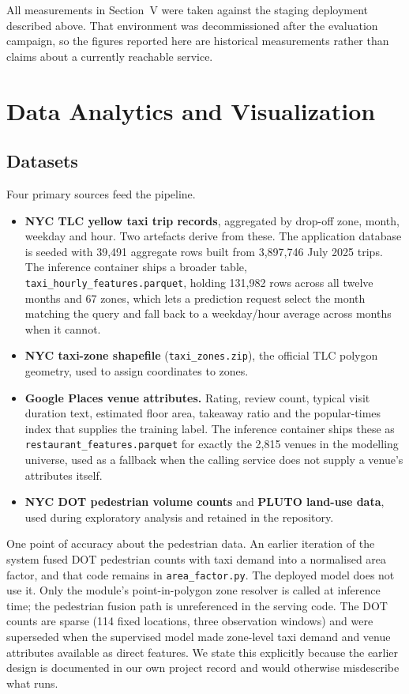 \documentclass[conference]{IEEEtran}
\begin{document}
All measurements in Section~V were taken against the staging deployment described above. That environment was decommissioned after the evaluation campaign, so the figures reported here are historical measurements rather than claims about a currently reachable service.

\section{Data Analytics and Visualization}

\subsection{Datasets}

Four primary sources feed the pipeline.

\begin{itemize}
\item \textbf{NYC TLC yellow taxi trip records}, aggregated by drop-off zone, month, weekday and hour. Two artefacts derive from these. The application database is seeded with 39{,}491 aggregate rows built from 3{,}897{,}746 July 2025 trips. The inference container ships a broader table, \texttt{taxi\_hourly\_features.parquet}, holding 131{,}982 rows across all twelve months and 67 zones, which lets a prediction request select the month matching the query and fall back to a weekday/hour average across months when it cannot.
\item \textbf{NYC taxi-zone shapefile} (\texttt{taxi\_zones.zip}), the official TLC polygon geometry, used to assign coordinates to zones.
\item \textbf{Google Places venue attributes.} Rating, review count, typical visit duration text, estimated floor area, takeaway ratio and the popular-times index that supplies the training label. The inference container ships these as \texttt{restaurant\_features.parquet} for exactly the 2{,}815 venues in the modelling universe, used as a fallback when the calling service does not supply a venue's attributes itself.
\item \textbf{NYC DOT pedestrian volume counts} and \textbf{PLUTO land-use data}, used during exploratory analysis and retained in the repository.
\end{itemize}

One point of accuracy about the pedestrian data. An earlier iteration of the system fused DOT pedestrian counts with taxi demand into a normalised area factor, and that code remains in \texttt{area\_factor.py}. The deployed model does not use it. Only the module's point-in-polygon zone resolver is called at inference time; the pedestrian fusion path is unreferenced in the serving code. The DOT counts are sparse (114 fixed locations, three observation windows) and were superseded when the supervised model made zone-level taxi demand and venue attributes available as direct features. We state this explicitly because the earlier design is documented in our own project record and would otherwise misdescribe what runs.
\end{document}
